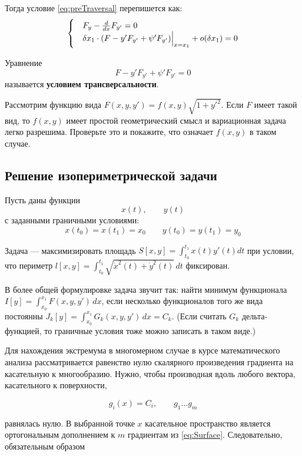 \documentclass[12pt]{article}
\begin{document}
			Тогда условие \ref{eq:preTraversal} перепишется как:
			$$
				\begin{cases}
					&F_y - \frac{d}{dx} F_{y'} = 0 \\
					&\delta x_1 \cdot (F - y'F_{y'} + \psi' F_{y'})\Big|_{x=x_1}^{} + o(\delta x_1) = 0
				\end{cases} 
			$$

			Уравнение
			$$F - y' F_{y'} + \psi' F_{y'} = 0$$
			называется \textbf{условием трансверсальности}.


			\exc Рассмотрим функцию вида $F(x, y, y') = f(x,y) \sqrt{1+y'^2}$. Если $F$ имеет такой вид, то
			$f(x,y)$ имеет простой геометрический смысл и вариационная задача легко разрешима. Проверьте это
			и покажите, что означает $f(x,y)$ в таком случае.

	\subsection{Решение изопериметрической задачи}


		Пусть даны функции 
		$$x(t),\qquad y(t)$$
		с заданными граничными условиями:
		$$x(t_0) = x(t_1) = x_0 \qquad y(t_0) = y(t_1) = y_0$$

		Задача --- максимизировать площадь $S[x,y] = \int_{t_0}^{t_1}x(t)y'(t) dt$ при условии, что периметр
		$l[x,y] = \int_{t_0}^{t_1} \sqrt{\dot{x}^2(t) + \dot{y}^2(t)}\,dt$ фиксирован.

		В более общей формулировке задача звучит так: найти минимум функционала
		$I[y] = \int_{x_0}^{x_1} F(x,y,y')\,dx$, если несколько функционалов того же вида постоянны
		$J_k[y] = \int_{x_0}^{x_1} G_k(x,y,y')\,dx = C_k$. (Если считать $G_k$ дельта-функцией, то граничные
		условия тоже можно записать в таком виде.)

		Для нахождения экстремума в многомерном случае в курсе математического анализа рассматривается
		равенство нулю скалярного произведения градиента на касательную к многообразию. Нужно, чтобы
		производная вдоль любого вектора, касательного к поверхности,

		\begin{equation}g_i(x) = C_i, \qquad g_1\ldots g_m \label{eq:Surface}\end{equation}

		равнялась нулю. В выбранной точке $x$ касательное пространство является ортогональным дополнением
		к $m$ градиентам из \ref{eq:Surface}. Следовательно, обязательным образом
		
\end{document}
